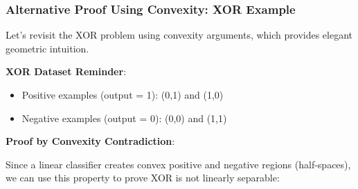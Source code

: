 \subsubsection{Alternative Proof Using Convexity: XOR Example}

Let's revisit the XOR problem using convexity arguments, which provides elegant geometric intuition.

\textbf{XOR Dataset Reminder}:
\begin{itemize}
    \item Positive examples (output = 1): (0,1) and (1,0)
    \item Negative examples (output = 0): (0,0) and (1,1)
\end{itemize}

\textbf{Proof by Convexity Contradiction}:

Since a linear classifier creates convex positive and negative regions (half-spaces), we can use this property to prove XOR is not linearly separable:

